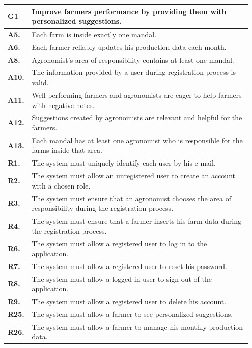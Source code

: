\begin{longtable}{p{0.07\linewidth} p{0.88\linewidth}} 
    \toprule
    \textbf{G1} & Improve farmers performance by providing them with personalized suggestions. \\ 
    \midrule
    \textbf{A5.} & Each farm is inside exactly one mandal.\\ 
    \textbf{A6.} & Each farmer reliably updates his production data each month.\\ 
    \textbf{A8.} & Agronomist's area of responsibility contains at least one mandal.\\ 
    \textbf{A10.} & The information provided by a user during registration process is valid.\\ 
    \textbf{A11.} & Well-performing farmers and agronomists are eager to help farmers with negative notes.\\ 
    \textbf{A12.} & Suggestions created by agronomists are relevant and helpful for the farmers. \\
    \textbf{A13.} & Each mandal has at least one agronomist who is responsible for the farms inside that area.\\ 
     
    \midrule		
	\textbf{R1.} & The system must uniquely identify each user by his e-mail. \\
	\textbf{R2.} & The system must allow an unregistered user to create an account with a chosen role. \\
	\textbf{R3.} & The system must ensure that an agronomist chooses the area of responsibility during the registration process. \\
	\textbf{R4.} & The system must ensure that a farmer inserts his farm data during the registration process.\\
	\textbf{R6.} & The system must allow a registered user to log in to the application. \\
	\textbf{R7.} & The system must allow a registered user to reset his password. \\
	\textbf{R8.} & The system must allow a logged-in user to sign out of the application. \\
	\textbf{R9.} & The system must allow a registered user to delete his account. \\
	
	\textbf{R25.} & The system must allow a farmer to see personalized suggestions.\\
	\textbf{R26.} & The system must allow a farmer to manage his monthly production data.\\
	

\end{longtable}
